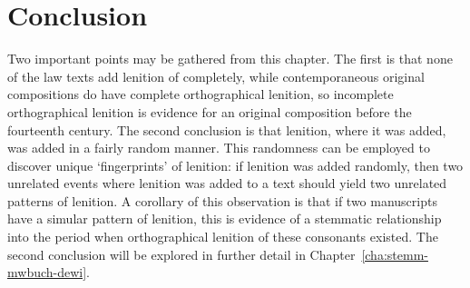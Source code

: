 \section{Conclusion}
\label{sec:lawconclus}
Two important points may be gathered from this chapter. The first is that none of the law texts add lenition of  completely, while contemporaneous original compositions do have complete orthographical lenition, so incomplete orthographical lenition is evidence for an original composition before the fourteenth century. The second conclusion is that lenition, where it was added, was added in a fairly random manner. This randomness can be employed to discover unique `fingerprints' of lenition: if lenition was added randomly, then two unrelated events where lenition was added to a text should yield two unrelated patterns of lenition. A corollary of this observation is that if two manuscripts have a simular pattern of lenition, this is evidence of a stemmatic relationship into the period when orthographical lenition of these consonants existed. The second conclusion will be explored in further detail in Chapter~\ref{cha:stemm-mwbuch-dewi}.







